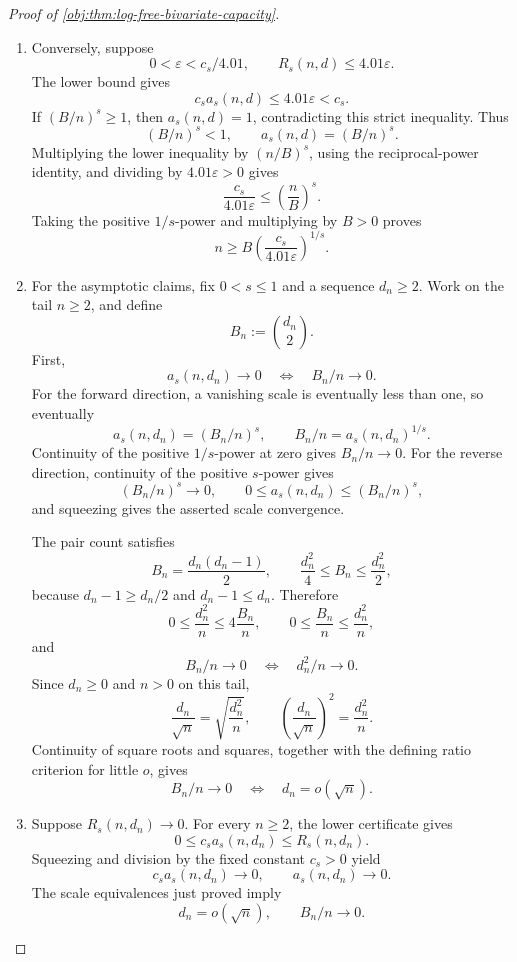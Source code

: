 \begin{proof}[Proof of \cref{obj:thm:log-free-bivariate-capacity}]
\begin{enumerate}
\item
Conversely, suppose
\[
0<\varepsilon<c_s/4.01,
\qquad
R_s(n,d)\leq4.01\varepsilon.
\]
The lower bound gives
\[
c_sa_s(n,d)\leq4.01\varepsilon<c_s.
\]
If \((B/n)^s\geq1\), then \(a_s(n,d)=1\), contradicting this strict inequality. Thus
\[
(B/n)^s<1,
\qquad
a_s(n,d)=(B/n)^s.
\]
Multiplying the lower inequality by \((n/B)^s\), using the reciprocal-power identity, and dividing by \(4.01\varepsilon>0\) gives
\[
\frac{c_s}{4.01\varepsilon}
\leq\left(\frac nB\right)^s.
\]
Taking the positive \(1/s\)-power and multiplying by \(B>0\) proves
\[
n\geq
B\left(\frac{c_s}{4.01\varepsilon}\right)^{1/s}.
\]

\item
For the asymptotic claims, fix \(0<s\leq1\) and a sequence \(d_n\geq2\). Work on the tail \(n\geq2\), and define
\[
B_n:=\binom{d_n}{2}.
\]
First,
\[
a_s(n,d_n)\longrightarrow0
\quad\Longleftrightarrow\quad
B_n/n\longrightarrow0.
\]
For the forward direction, a vanishing scale is eventually less than one, so eventually
\[
a_s(n,d_n)=(B_n/n)^s,
\qquad
B_n/n=a_s(n,d_n)^{1/s}.
\]
Continuity of the positive \(1/s\)-power at zero gives \(B_n/n\to0\).
For the reverse direction, continuity of the positive \(s\)-power gives
\[
(B_n/n)^s\longrightarrow0,
\qquad
0\leq a_s(n,d_n)\leq(B_n/n)^s,
\]
and squeezing gives the asserted scale convergence.

The pair count satisfies
\[
B_n=\frac{d_n(d_n-1)}2,
\qquad
\frac{d_n^2}{4}\leq B_n\leq\frac{d_n^2}{2},
\]
because \(d_n-1\geq d_n/2\) and \(d_n-1\leq d_n\). Therefore
\[
0\leq\frac{d_n^2}{n}\leq4\frac{B_n}{n},
\qquad
0\leq\frac{B_n}{n}\leq\frac{d_n^2}{n},
\]
and
\[
B_n/n\longrightarrow0
\quad\Longleftrightarrow\quad
d_n^2/n\longrightarrow0.
\]
Since \(d_n\geq0\) and \(n>0\) on this tail,
\[
\frac{d_n}{\sqrt n}
=
\sqrt{\frac{d_n^2}{n}},
\qquad
\left(\frac{d_n}{\sqrt n}\right)^2
=
\frac{d_n^2}{n}.
\]
Continuity of square roots and squares, together with the defining ratio criterion for little \(o\), gives
\[
B_n/n\longrightarrow0
\quad\Longleftrightarrow\quad
d_n=o(\sqrt n).
\]

\item
Suppose \(R_s(n,d_n)\to0\). For every \(n\geq2\), the lower certificate gives
\[
0\leq c_sa_s(n,d_n)\leq R_s(n,d_n).
\]
Squeezing and division by the fixed constant \(c_s>0\) yield
\[
c_sa_s(n,d_n)\longrightarrow0,
\qquad
a_s(n,d_n)\longrightarrow0.
\]
The scale equivalences just proved imply
\[
d_n=o(\sqrt n),
\qquad
B_n/n\longrightarrow0.
\]


\end{enumerate}
\end{proof}

